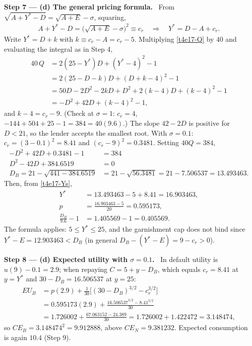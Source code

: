 \documentclass[11pt,a4paper]{article}
\newcommand{\step}[2]{\par\medskip\noindent\textbf{Step #1 --- #2.}~}
\begin{document}
\step{7}{(d) The general pricing formula} From $\sqrt{A+Y^*-D}=\sqrt{A+E}-\sigma$, squaring,
\begin{align}
  A+Y^*-D = \big(\sqrt{A+E}-\sigma\big)^2 \equiv c_r \quad\Longrightarrow\quad Y^* = D-A+c_r. \label{t4e17-Ys}
\end{align}
Write $Y^*=D+k$ with $k\equiv c_r-A=c_r-5$. Multiplying \eqref{t4e17-Q} by $40$ and evaluating the integral as in Step 4,
\begin{align}
  40\,Q &= 2(25-Y^*)D + (Y^*-4)^2-1 \nonumber\\
        &= 2(25-D-k)D + (D+k-4)^2-1 \nonumber\\
        &= 50D-2D^2-2kD + D^2+2(k-4)D+(k-4)^2-1 \nonumber\\
        &= -D^2+42D+(k-4)^2-1, \label{t4e17-40Q}
\end{align}
and $k-4=c_r-9$. (Check at $\sigma=1$: $c_r=4$, $-144+504+25-1=384=40(9.6)$.) The slope $42-2D$ is
positive for $D<21$, so the lender accepts the smallest root. With $\sigma=0.1$:
$c_r=(3-0.1)^2=8.41$ and $(c_r-9)^2=0.3481$. Setting $40Q=384$,
\begin{align}
  -D^2+42D+0.3481-1 &= 384 \nonumber\\
  D^2-42D+384.6519 &= 0 \nonumber\\
  D_B = 21-\sqrt{441-384.6519} &= 21-\sqrt{56.3481} = 21-7.506537 = 13.493463. \label{t4e17-DB}
\end{align}
Then, from \eqref{t4e17-Ys},
\begin{align}
  Y^* &= 13.493463-5+8.41 = 16.903463, \nonumber\\
  p   &= \frac{16.903463-5}{20} = 0.595173, \nonumber\\
  \frac{D_B}{9.6}-1 &= 1.405569-1 = 0.405569. \nonumber
\end{align}
The formula applies: $5\le Y^*\le 25$, and the garnishment cap does not bind since
$Y^*-E=12.903463<D_B$ (in general $D_B-(Y^*-E)=9-c_r>0$).

\step{8}{(d) Expected utility with $\sigma=0.1$} In default utility is $u(9)-0.1=2.9$; when repaying $C=5+y-D_B$,
which equals $c_r=8.41$ at $y=Y^*$ and $30-D_B=16.506537$ at $y=25$:
\begin{align}
  EU_B &= p(2.9) + \frac1{30}\Big[(30-D_B)^{3/2}-c_r^{3/2}\Big] \nonumber\\
       &= 0.595173(2.9) + \frac{16.506537^{3/2}-8.41^{3/2}}{30} \nonumber\\
       &= 1.726002 + \frac{67.063152-24.389}{30} = 1.726002+1.422472 = 3.148474, \label{t4e17-EUB2}
\end{align}
so $CE_B=3.148474^2=9.912888$, above $CE_N=9.381232$. Expected consumption is again $10.4$ (Step 9).
\end{document}
